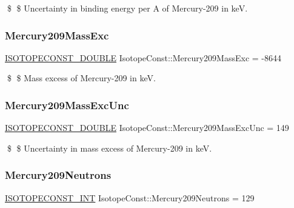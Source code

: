 \$ \$ Uncertainty in binding energy per A of Mercury-\/209 in keV. \mbox{\label{group___isotope_const-_mercury-_hg209_ga2e471d847f81205b3a42b062b8ced1a2}} 
\subsubsection{\texorpdfstring{Mercury209\+Mass\+Exc}{Mercury209MassExc}}
{\footnotesize\ttfamily \mbox{\hyperlink{group___isotope_const-_macros_ga8f45a7272ce02c0b4c65c44636ed719a}{I\+S\+O\+T\+O\+P\+E\+C\+O\+N\+S\+T\+\_\+\+D\+O\+U\+B\+LE}} Isotope\+Const\+::\+Mercury209\+Mass\+Exc = -\/8644}

\$ \$ Mass excess of Mercury-\/209 in keV. \mbox{\label{group___isotope_const-_mercury-_hg209_gabac9f2379ab9ca4ffd5f752cbbbfce39}} 
\subsubsection{\texorpdfstring{Mercury209\+Mass\+Exc\+Unc}{Mercury209MassExcUnc}}
{\footnotesize\ttfamily \mbox{\hyperlink{group___isotope_const-_macros_ga8f45a7272ce02c0b4c65c44636ed719a}{I\+S\+O\+T\+O\+P\+E\+C\+O\+N\+S\+T\+\_\+\+D\+O\+U\+B\+LE}} Isotope\+Const\+::\+Mercury209\+Mass\+Exc\+Unc = 149}

\$ \$ Uncertainty in mass excess of Mercury-\/209 in keV. \mbox{\label{group___isotope_const-_mercury-_hg209_gaa517d865ac0a24feb6d2668cad4e7d05}} 
\subsubsection{\texorpdfstring{Mercury209\+Neutrons}{Mercury209Neutrons}}
{\footnotesize\ttfamily \mbox{\hyperlink{group___isotope_const-_macros_ga5f18360b3e99483a35c32d789e62621c}{I\+S\+O\+T\+O\+P\+E\+C\+O\+N\+S\+T\+\_\+\+I\+NT}} Isotope\+Const\+::\+Mercury209\+Neutrons = 129}

